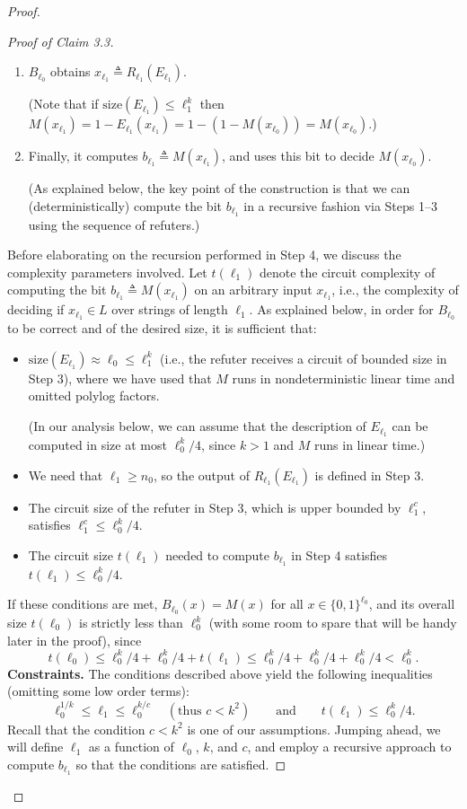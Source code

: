 \documentclass[11pt]{article}
\newcommand{\size}{\mathrm{size}}
\begin{document}
\begin{proof}
\begin{proof}[Proof of Claim 3.3]
\begin{enumerate}[label=(\arabic*)]
(The value $\ell_1<\ell_0$ will be defined below.)
\item $B_{\ell_0}$ obtains $x_{\ell_1}\triangleq R_{\ell_1}(E_{\ell_1})$.

(Note that if $\size(E_{\ell_1})\le\ell_1^k$ then $M(x_{\ell_1})=1-E_{\ell_1}(x_{\ell_1})=1-(1-M(x_{\ell_0}))=M(x_{\ell_0})$.)
\item Finally, it computes $b_{\ell_1}\triangleq M(x_{\ell_1})$, and uses this bit to decide $M(x_{\ell_0})$.

(As explained below, the key point of the construction is that we can (deterministically) compute the bit $b_{\ell_1}$ in a recursive fashion via Steps 1--3 using the sequence of refuters.)
\end{enumerate}
Before elaborating on the recursion performed in Step 4, we discuss the complexity parameters involved. Let $t(\ell_1)$ denote the circuit complexity of computing the bit $b_{\ell_1}\triangleq M(x_{\ell_1})$ on an arbitrary input $x_{\ell_1}$, i.e., the complexity of deciding if $x_{\ell_1}\in L$ over strings of length $\ell_1$. As explained below, in order for $B_{\ell_0}$ to be correct and of the desired size, it is sufficient that:
\begin{itemize}
\item $\size(E_{\ell_1})\approx\ell_0\le\ell_1^k$ (i.e., the refuter receives a circuit of bounded size in Step 3), where we have used that $M$ runs in nondeterministic linear time and omitted polylog factors.

(In our analysis below, we can assume that the description of $E_{\ell_1}$ can be computed in size at most $\ell_0^k/4$, since $k>1$ and $M$ runs in linear time.)
\item We need that $\ell_1\ge n_0$, so the output of $R_{\ell_1}(E_{\ell_1})$ is defined in Step 3.
\item The circuit size of the refuter in Step 3, which is upper bounded by $\ell_1^c$, satisfies $\ell_1^c\le\ell_0^k/4$.
\item The circuit size $t(\ell_1)$ needed to compute $b_{\ell_1}$ in Step 4 satisfies $t(\ell_1)\le\ell_0^k/4$.
\end{itemize}
If these conditions are met, $B_{\ell_0}(x)=M(x)$ for all $x\in\{0,1\}^{\ell_0}$, and its overall size $t(\ell_0)$ is strictly less than $\ell_0^k$ (with some room to spare that will be handy later in the proof), since
\[
t(\ell_0)\le\ell_0^k/4+\ell_0^k/4+t(\ell_1)\le\ell_0^k/4+\ell_0^k/4+\ell_0^k/4<\ell_0^k.
\]
\noindent\textbf{Constraints.} The conditions described above yield the following inequalities (omitting some low order terms):
\[
\ell_0^{1/k}\le\ell_1\le\ell_0^{k/c}\quad(\text{thus }c<k^2)\qquad\text{and}\qquad t(\ell_1)\le\ell_0^k/4.
\]
Recall that the condition $c<k^2$ is one of our assumptions. Jumping ahead, we will define $\ell_1$ as a function of $\ell_0$, $k$, and $c$, and employ a recursive approach to compute $b_{\ell_1}$ so that the conditions are satisfied.


\end{proof}
\end{proof}
\end{document}
